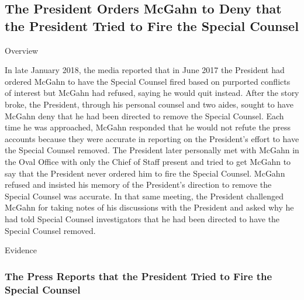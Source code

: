 \subsection{The President Orders McGahn to Deny that the President Tried to Fire the Special Counsel}

Overview

In late January 2018, the media reported that in June 2017 the President had ordered McGahn to have the Special Counsel fired based on purported conflicts of interest but McGahn had refused, saying he would quit instead.
After the story broke, the President, through his personal counsel and two aides, sought to have McGahn deny that he had been directed to remove the Special Counsel.
Each time he was approached, McGahn responded that he would not refute the press accounts because they were accurate in reporting on the President's effort to have the Special Counsel removed.
The President later personally met with McGahn in the Oval Office with only the Chief of Staff present and tried to get McGahn to say that the President never ordered him to fire the Special Counsel.
McGahn refused and insisted his memory of the President's direction to remove the Special Counsel was accurate.
In that same meeting, the President challenged McGahn for taking notes of his discussions with the President and asked why he had told Special Counsel investigators that he had been directed to have the Special Counsel removed.

Evidence

\subsubsection{The Press Reports that the President Tried to Fire the Special Counsel}

